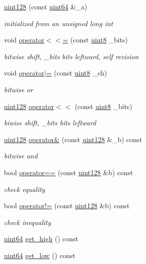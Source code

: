 \begin{DoxyCompactItemize}
\hyperlink{classuint128_a655c92ad28efbc6378c95510556475a7}{uint128} (const \hyperlink{types_8h_a60e8696a4678cd348e991a1f172e53f7}{uint64} \&\+\_\+a)
\begin{DoxyCompactList}\small\item\em initialized from an unsigned long int \end{DoxyCompactList}\item 
void \hyperlink{classuint128_a09c291d8b7c8f1e2d3a4dd3a763408d9}{operator$<$$<$=} (const \hyperlink{types_8h_a115946cb5fc5879545e9ccea096a6031}{uint8} \+\_\+bits)
\begin{DoxyCompactList}\small\item\em bitwise shift, \+\_\+bits bits leftward, self revision \end{DoxyCompactList}\item 
void \hyperlink{classuint128_a04bf2e2eb85e66ed7c722a8d5494b0a4}{operator$\vert$=} (const \hyperlink{types_8h_a115946cb5fc5879545e9ccea096a6031}{uint8} \+\_\+ch)
\begin{DoxyCompactList}\small\item\em bitwise or \end{DoxyCompactList}\item 
\hyperlink{classuint128}{uint128} \hyperlink{classuint128_a24dc256af129ab352a5d52793dfbe514}{operator$<$$<$} (const \hyperlink{types_8h_a115946cb5fc5879545e9ccea096a6031}{uint8} \+\_\+bits)
\begin{DoxyCompactList}\small\item\em biwise shift, \+\_\+bits bits leftward \end{DoxyCompactList}\item 
\hyperlink{classuint128}{uint128} \hyperlink{classuint128_a227d131e34d73974124c38cfbf0c6cc4}{operator\&} (const \hyperlink{classuint128}{uint128} \&\+\_\+b) const
\begin{DoxyCompactList}\small\item\em bitwise and \end{DoxyCompactList}\item 
bool \hyperlink{classuint128_a0f3b16aec08d80f999b17762b15ed0c5}{operator==} (const \hyperlink{classuint128}{uint128} \&b) const
\begin{DoxyCompactList}\small\item\em check equality \end{DoxyCompactList}\item 
bool \hyperlink{classuint128_a767bfa81f69c7884cbb9434c37435e50}{operator!=} (const \hyperlink{classuint128}{uint128} \&b) const
\begin{DoxyCompactList}\small\item\em check inequality \end{DoxyCompactList}\item 
\hyperlink{types_8h_a60e8696a4678cd348e991a1f172e53f7}{uint64} \hyperlink{classuint128_a597036514f1abbbc8626492230f3436f}{get\+\_\+high} () const
\item 
\hyperlink{types_8h_a60e8696a4678cd348e991a1f172e53f7}{uint64} \hyperlink{classuint128_adeb81ae4b8a8acbf46131e17ff7acc05}{get\+\_\+low} () const
\end{DoxyCompactItemize}
